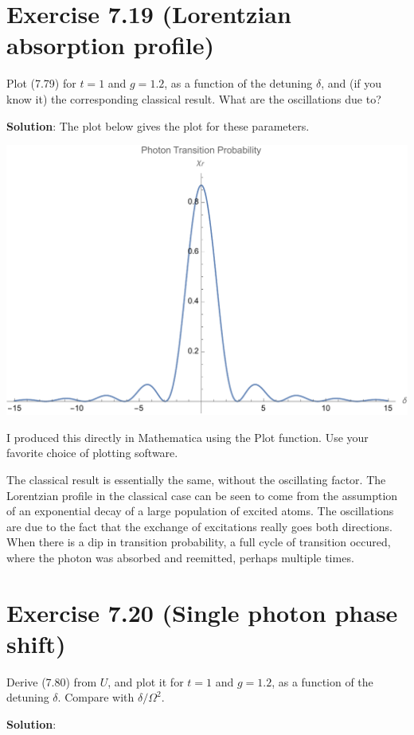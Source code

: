 \documentclass{book}
\begin{document}
\section*{Exercise 7.19 (Lorentzian absorption profile)}
    Plot (7.79) for $t = 1$ and $g = 1.2$, as a function of the detuning $\delta$, and (if you know it) the corresponding classical result. What are the oscillations due to?

    \textbf{Solution}: The plot below gives the plot for these parameters.
    \begin{center}
        \includegraphics{Exercise7.19.pdf}
    \end{center}
    I produced this directly in Mathematica using the Plot function. Use your favorite choice of plotting software.

    The classical result is essentially the same, without the oscillating factor. The Lorentzian profile in the classical case can be seen to come from the assumption of an exponential decay of a large population of excited atoms. The oscillations are due to the fact that the exchange of excitations really goes both directions. When there is a dip in transition probability, a full cycle of transition occured, where the photon was absorbed and reemitted, perhaps multiple times. 

\section*{Exercise 7.20 (Single photon phase shift)}
    Derive (7.80) from $U$, and plot it for $t = 1$ and $g = 1.2$, as a function of the detuning $\delta$. Compare with $\delta/\Omega^2$.

    \textbf{Solution}:
\end{document}
